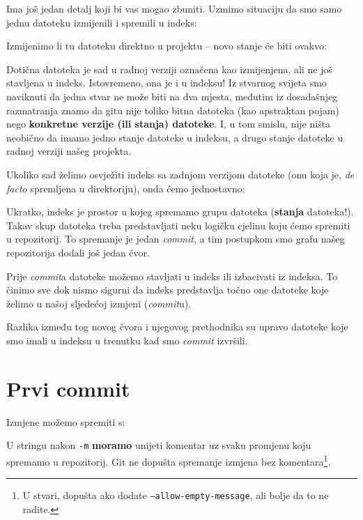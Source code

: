 Ima još jedan detalj koji bi vas mogao zbuniti. 
Uzmimo situaciju da smo samo jednu datoteku izmijenili i spremili u indeks:



Izmijenimo li tu datoteku direktno u projektu -- novo stanje će biti ovakvo:



Dotična datoteka je sad u radnoj verziji označena kao izmijenjena, ali ne još stavljena u indeks.
Istovremeno, ona je i u indeksu!
Iz stvarnog svijeta smo naviknuti da jedna stvar ne može biti na dva mjesta, međutim iz dosadašnjeg razmatranja znamo da gitu nije toliko bitna datoteka (kao apstraktan pojam) nego \textbf{konkretne verzije (ili stanja) datoteke}.
I, u tom smislu, nije ništa neobično da imamo jedno stanje datoteke u indeksu, a drugo stanje datoteke u radnoj verziji našeg projekta.

Ukoliko sad želimo osvježiti indeks sa zadnjom verzijom datoteke (onu koja je, \emph{de facto} spremljena u direktoriju), onda ćemo jednostavno:


Ukratko, indeks je prostor u kojeg spremamo grupu datoteka (\textbf{stanja} datoteka!).
Takav skup datoteka treba predstavljati neku logičku cjelinu koju ćemo spremiti u repozitorij.
To spremanje je jedan \emph{commit}, a tim postupkom smo grafu našeg repozitorija dodali još jedan čvor. 

Prije \emph{commit}a datoteke možemo stavljati u indeks ili izbacivati iz indeksa.
To činimo sve dok nismo sigurni da indeks predstavlja točno one datoteke koje želimo u našoj sljedećoj izmjeni (\emph{commit}u).

Razlika između tog novog čvora i njegovog prethodnika su upravo datoteke koje smo imali u indeksu u trenutku kad smo \emph{commit} izvršili.

\section*{Prvi commit}

Izmjene možemo spremiti s:


U stringu nakon \verb+-m+ \textbf{moramo} unijeti komentar uz svaku promjenu koju spremamo u repozitorij.
Git ne dopušta spremanje izmjena bez komentara\footnote{U stvari, dopušta ako dodate \texttt{--allow-empty-message}, ali bolje da to ne radite.}.

